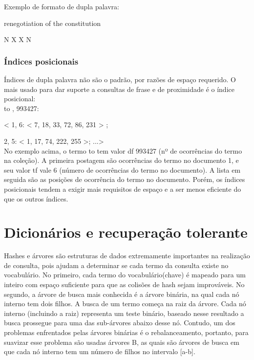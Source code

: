 Exemplo de formato de dupla palavra:

renegotiation of the constitution

N X X N

\subsubsection{Índices posicionais}

Índices de dupla palavra não são o padrão, por razões de espaço requerido. O mais usado para dar suporte a consultas de frase e de proximidade é o índice posicional: \\

to , 993427:

< 1, 6: < 7, 18, 33, 72, 86, 231 > ;

\hspace{0.4cm}2, 5: < 1, 17, 74, 222, 255 >; ...>\\

No exemplo acima, o termo to tem valor df 993427 (nº de ocorrências do termo na coleção). A primeira postagem são ocorrências do termo no documento 1, e seu valor tf vale 6 (número de ocorrências do termo no documento). A lista em seguida são as posições de ocorrência do termo no documento. Porém, os índices posicionais tendem a exigir mais requisitos de espaço e a ser menos eficiente do que os outros índices.

\section{Dicionários e recuperação tolerante}
\label{sec:dicionarios}

  Hashes e árvores são estruturas de dados extremamente importantes na realização de consulta, pois ajudam a determinar se cada termo da consulta existe no vocabulário. No primeiro, cada termo do vocabulário(chave) é mapeado para um inteiro com espaço suficiente para que as colisões de hash sejam improváveis. No segundo, a árvore de busca mais conhecida é a árvore binária, na qual cada nó interno tem dois filhos. A busca de um termo começa na raiz da árvore. Cada nó interno (incluindo a raiz) representa um teste binário, baseado nesse resultado a busca prossegue para uma das sub-árvores abaixo desse nó. Contudo, um dos problemas enfrentados pelas árvores binárias é o rebalanceamento, portanto, para suavizar esse problema são usadas árvores B, as quais são árvores de busca em que cada nó interno tem um número de filhos no intervalo [a-b].
   
